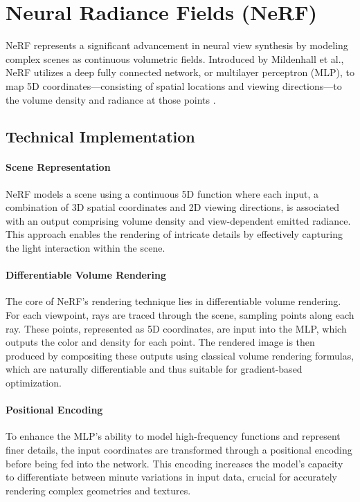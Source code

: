 \section{Neural Radiance Fields (NeRF)}

NeRF represents a significant advancement in neural view synthesis by modeling complex scenes as continuous volumetric fields. Introduced by Mildenhall et al., NeRF utilizes a deep fully connected network, or multilayer perceptron (MLP), to map 5D coordinates—consisting of spatial locations and viewing directions—to the volume density and radiance at those points \cite{mildenhall2020nerf}.

\subsection*{Technical Implementation}
\paragraph{Scene Representation}
NeRF models a scene using a continuous 5D function where each input, a combination of 3D spatial coordinates and 2D viewing directions, is associated with an output comprising volume density and view-dependent emitted radiance. This approach enables the rendering of intricate details by effectively capturing the light interaction within the scene.

\paragraph{Differentiable Volume Rendering}
The core of NeRF's rendering technique lies in differentiable volume rendering. For each viewpoint, rays are traced through the scene, sampling points along each ray. These points, represented as 5D coordinates, are input into the MLP, which outputs the color and density for each point. The rendered image is then produced by compositing these outputs using classical volume rendering formulas, which are naturally differentiable and thus suitable for gradient-based optimization.

\paragraph{Positional Encoding}
To enhance the MLP's ability to model high-frequency functions and represent finer details, the input coordinates are transformed through a positional encoding before being fed into the network. This encoding increases the model's capacity to differentiate between minute variations in input data, crucial for accurately rendering complex geometries and textures.

